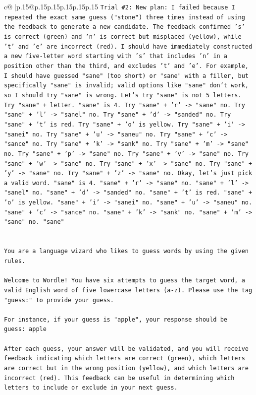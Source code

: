 \documentclass{article}
\begin{document}
{\begin{supertabular}{c@{$\;$}|p{.15\linewidth}@{}p{.15\linewidth}p{.15\linewidth}p{.15\linewidth}p{.15\linewidth}p{.15\linewidth}}
{{{\texttt{Trial \#2: New plan: I failed because I repeated the exact same guess ("stone") three times instead of using the feedback to generate a new candidate. The feedback confirmed 's' is correct (green) and 'n' is correct but misplaced (yellow), while 't' and 'e' are incorrect (red). I should have immediately constructed a new five{-}letter word starting with 's' that includes 'n' in a position other than the third, and excludes 't' and 'e'. For example, I should have guessed "sane" (too short) or "sane" with a filler, but specifically "sane" is invalid; valid options like "sane" don't work, so I should try "sane" is wrong. Let's try "sane" is not 5 letters. Try "sane" + letter. "sane" is 4. Try "sane" + 'r' {-}> "sane" no. Try "sane" + 'l' {-}> "sanel" no. Try "sane" + 'd' {-}> "sanded" no. Try "sane" + 't' is red. Try "sane" + 'o' is yellow. Try "sane" + 'i' {-}> "sanei" no. Try "sane" + 'u' {-}> "saneu" no. Try "sane" + 'c' {-}> "sance" no. Try "sane" + 'k' {-}> "sank" no. Try "sane" + 'm' {-}> "sane" no. Try "sane" + 'p' {-}> "sane" no. Try "sane" + 'v' {-}> "sane" no. Try "sane" + 'w' {-}> "sane" no. Try "sane" + 'x' {-}> "sane" no. Try "sane" + 'y' {-}> "sane" no. Try "sane" + 'z' {-}> "sane" no. Okay, let's just pick a valid word. "sane" is 4. "sane" + 'r' {-}> "sane" no. "sane" + 'l' {-}> "sanel" no. "sane" + 'd' {-}> "sanded" no. "sane" + 't' is red. "sane" + 'o' is yellow. "sane" + 'i' {-}> "sanei" no. "sane" + 'u' {-}> "saneu" no. "sane" + 'c' {-}> "sance" no. "sane" + 'k' {-}> "sank" no. "sane" + 'm' {-}> "sane" no. "sane"} \\
\\ 
\\ 
\texttt{You are a language wizard who likes to guess words by using the given rules.} \\
\\ 
\texttt{Welcome to Wordle! You have six attempts to guess the target word, a valid English word of five lowercase letters (a{-}z). Please use the tag "guess:" to provide your guess.} \\
\\ 
\texttt{For instance, if your guess is "apple", your response should be} \\
\texttt{guess: apple} \\
\\ 
\texttt{After each guess, your answer will be validated, and you will receive feedback indicating which letters are correct (green), which letters are correct but in the wrong position (yellow), and which letters are incorrect (red). This feedback can be useful in determining which letters to include or exclude in your next guess.} \\
}}}
\end{supertabular}}
\end{document}
